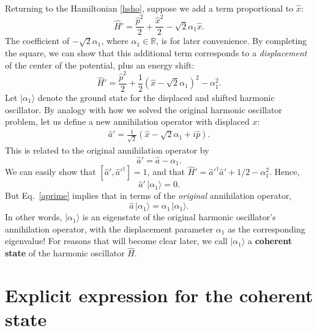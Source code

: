 \documentclass[pra,12pt]{revtex4}
\begin{document}
Returning to the Hamiltonian \eqref{hsho}, suppose we add a term
proportional to $\hat{x}$:
\begin{equation}
  \hat{H}' = \frac{\hat{p}^2}{2} + \frac{\hat{x}^2}{2} - \sqrt{2}\alpha_1\hat{x}.
  \label{hshift}
\end{equation}
The coefficient of $-\sqrt{2}\alpha_1$, where $\alpha_1 \in
\mathbb{R}$, is for later convenience.  By completing the square, we
can show that this additional term corresponds to a
\textit{displacement} of the center of the potential, plus an energy
shift:
\begin{equation}
  \hat{H}' = \frac{\hat{p}^2}{2} + \frac{1}{2}\left(\hat{x} - \sqrt{2}\alpha_1\right)^2 - \alpha_1^2.
\end{equation}
Let $|\alpha_1\rangle$ denote the ground state for the displaced and
shifted harmonic oscillator.  By analogy with how we solved the
original harmonic oscillator problem, let us define a new annihilation
operator with displaced $x$:
\begin{align}
  \hat{a}' = \frac{1}{\sqrt{2}}\left(\hat{x} - \sqrt{2}\alpha_1 + i \hat{p}\right).
\end{align}
This is related to the original annihilation operator by
\begin{equation}
  \hat{a}' = \hat{a} - \alpha_1.
  \label{aprime}
\end{equation}
We can easily show that $[\hat{a}',\hat{a}'^\dagger] = 1$, and that
$\hat{H}' = \hat{a}'^\dagger \hat{a}' + 1/2 - \alpha_1^2$.  Hence,
\begin{equation}
  \hat{a}' \, |\alpha_1 \rangle = 0.
\end{equation}
But Eq.~\eqref{aprime} implies that in terms of the \textit{original}
annihilation operator,
\begin{equation}
  \hat{a}\, |\alpha_1\rangle = \alpha_1 \,|\alpha_1\rangle.
  \label{aeigenv}
\end{equation}
In other words, $|\alpha_1\rangle$ is an eigenstate of the original
harmonic oscillator's annihilation operator, with the displacement
parameter $\alpha_1$ as the corresponding eigenvalue!  For reasons
that will become clear later, we call $|\alpha_1\rangle$ a
\textbf{coherent state} of the harmonic oscillator $\hat{H}$.

\section{Explicit expression for the coherent state}
\end{document}
